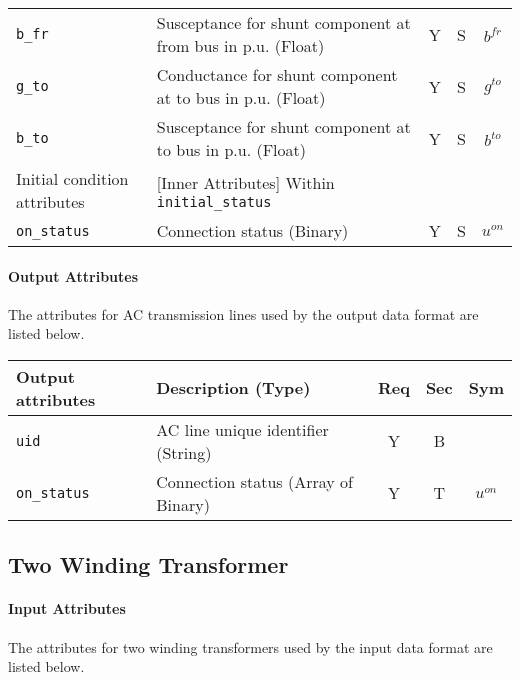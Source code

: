 \documentclass{article}
\begin{document}
\begin{center}
\begin{tabular}{ l | l | c | c | c | }
  {\tt b\_fr} & Susceptance for shunt component at from bus in p.u. (Float)& Y & S & $b^{fr}$\\
  {\tt g\_to} & Conductance for shunt component at to bus in p.u. (Float)& Y & S & $g^{to}$\\
  {\tt b\_to} & Susceptance for shunt component at to bus in p.u. (Float)& Y & S & $b^{to}$\\
  \hline
  Initial condition attributes & [Inner Attributes] Within {\tt initial\_status} & & & \\
  \hline
  {\tt on\_status} & Connection status (Binary) & Y & S & $u^{on}$ \\
  \hline
\end{tabular}
\end{center}

\paragraph{Output Attributes}
The attributes for AC transmission lines used by the output data format are listed below.
\begin{center}
\small
\begin{tabular}{ l | l | c | c | c |}
Output attributes & Description (Type)& Req & Sec & Sym\\
\hline
 {\tt uid} & AC line unique identifier (String)& Y & B & \\
 {\tt on\_status} & Connection status (Array of Binary) & Y & T & $u^{on}$ \\
\hline
\end{tabular}
\end{center}
\subsection{Two Winding Transformer}
\label{nom:transformer}

\paragraph{Input Attributes}
The attributes for two winding transformers used by the
input data format are listed below.
\end{document}
